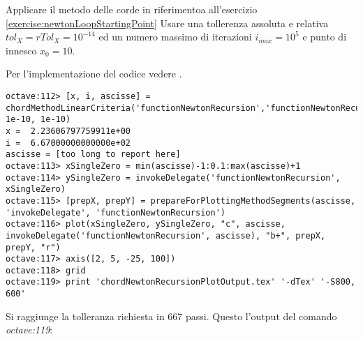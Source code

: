 \begin{exercise}
Applicare il metodo delle corde in riferimentoa all'esercizio
\ref{exercise:newtonLoopStartingPoint} 
Usare una tollerenza assoluta e relativa
$tol_{X} = rTol_{X} = 10^{-14}$ ed un numero massimo di iterazioni
$i_{max} = 10^{5}$ e punto di innesco $x_{0} = 10$.
\end{exercise}
Per l'implementazione del codice vedere .
\begin{lstlisting}
octave:112> [x, i, ascisse] = chordMethodLinearCriteria('functionNewtonRecursion','functionNewtonRecursionDerivative',10,1e5, 1e-10, 1e-10)
x =  2.23606797759911e+00
i =  6.67000000000000e+02
ascisse = [too long to report here]
octave:113> xSingleZero = min(ascisse)-1:0.1:max(ascisse)+1
octave:114> ySingleZero = invokeDelegate('functionNewtonRecursion', xSingleZero)
octave:115> [prepX, prepY] = prepareForPlottingMethodSegments(ascisse, 'invokeDelegate', 'functionNewtonRecursion')
octave:116> plot(xSingleZero, ySingleZero, "c", ascisse, invokeDelegate('functionNewtonRecursion', ascisse), "b+", prepX, prepY, "r")
octave:117> axis([2, 5, -25, 100])
octave:118> grid
octave:119> print 'chordNewtonRecursionPlotOutput.tex' '-dTex' '-S800, 600'
\end{lstlisting}
Si raggiunge la tolleranza richiesta in 667 passi. Questo l'output del comando
\emph{octave:119}:
\begin{center}

\end{center}
